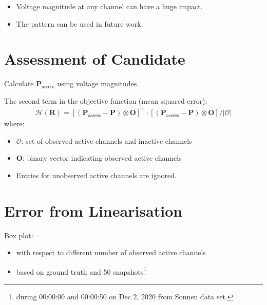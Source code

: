 \documentclass[
]{book}
\providecommand{\tightlist}{%
  \setlength{\itemsep}{0pt}\setlength{\parskip}{0pt}}
\begin{document}
\begin{itemize}
\tightlist
\item
  Voltage magnitude at any channel can have a huge impact.
\item
  The pattern can be used in future work.
\end{itemize}

\hypertarget{assessment}{%
\section{Assessment of Candidate}\label{assessment}}

Calculate \(\boldsymbol{P}_\text{assess}\) using voltage magnitudes.

The second term in the objective function (mean squared error):
\[ \begin{aligned}
  \mathcal{H}(\boldsymbol{R}) =
  \left[
    (\boldsymbol{P}_\text{assess} - \boldsymbol{P})
    \otimes \boldsymbol{O}
  \right]^\top
  \cdot \left[
    (\boldsymbol{P}_\text{assess} - \boldsymbol{P})
    \otimes \boldsymbol{O}
  \right]
  / |\mathcal{O}|
\end{aligned} \]
where:

\begin{itemize}
\tightlist
\item
  \(\mathcal{O}\): set of observed active channels and inactive channels
\item
  \(\boldsymbol{O}\): binary vector indicating observed active channels
\item
  Entries for unobserved active channels are ignored.
\end{itemize}

\hypertarget{error}{%
\section{Error from Linearisation}\label{error}}

Box plot:

\begin{itemize}
\tightlist
\item
  with respect to different number of observed active channels
\item
  based on ground truth and 50 snapshots\footnote{during 00:00:00 and 00:00:50 on Dec
    2, 2020 from Sonnen data set.}
\end{itemize}
\end{document}

